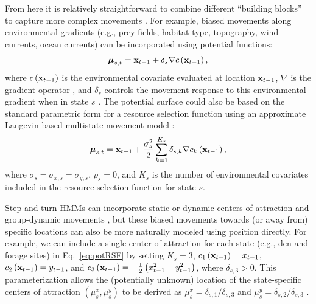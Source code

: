 \documentclass[12pt]{article}\usepackage[]{graphicx}\usepackage[]{xcolor}
\begin{document}
From here it is relatively straightforward to combine different ``building blocks'' to capture more complex movements \citep[e.g.,][]{McClintockEtAl2022}. For example, biased movements along environmental gradients (e.g., prey fields, habitat type, topography, wind currents, ocean currents) can be incorporated using potential functions:
\begin{equation}
\label{eq:potFun}
    {\boldsymbol \mu}_{s,t} = {\bf x}_{t-1} + \delta_s \nabla c \left({\bf x}_{t-1}\right),
\end{equation}
where $c \left({\bf x}_{t-1}\right)$ is the environmental covariate evaluated at location ${\bf x}_{t-1}$, $\nabla$ is the gradient operator \citep[for details on calculating gradients in this context, see][]{GardnerEtAl2022}, and $\delta_s$ controls the movement response to this environmental gradient when in state $s$ \citep[e.g.,][]{BrillingerEtAl2012,HootenEtAl2019}. The potential surface could also be based on the standard parametric form for a resource selection function using an approximate Langevin-based multistate movement model \citep[e.g.,][]{MichelotEtAl2019,McClintockLander2024}:
\begin{equation}
\label{eq:potRSF}
    {\boldsymbol \mu}_{s,t} = {\bf x}_{t-1} + \frac{\sigma_s^2}{2} \sum_{k=1}^{K_s} \delta_{s,k} \nabla c_k\left({\bf x}_{t-1}\right),
\end{equation}
where $\sigma_s=\sigma_{x,s}=\sigma_{y,s}$, $\rho_s=0$, and $K_s$ is the number of environmental covariates included in the resource selection function for state $s$.%

Step and turn HMMs can incorporate static or dynamic centers of attraction \citep[e.g.,][]{McClintockEtAl2012,PirottaEtAl2018} and group-dynamic movements \citep[e.g.,][]{LangrockEtAl2014}, but these biased movements towards (or away from) specific locations can also be more naturally modeled using position directly. For example, we can include a single center of attraction for each state (e.g., den and forage sites) in Eq.\ \ref{eq:potRSF} by setting $K_s=3$, $c_1\left({\bf x}_{t-1}\right)=x_{t-1}$, $c_2\left({\bf x}_{t-1}\right)=y_{t-1}$, and $c_3\left({\bf x}_{t-1}\right)=-\frac{1}{2}\left(x_{t-1}^2+y_{t-1}^2\right)$, where $\delta_{s,3}>0$.
This parameterization allows the (potentially unknown) location of the state-specific centers of attraction $\left(\mu^x_s,\mu^y_s\right)$ to be derived as $\mu^x_s=\delta_{s,1}/\delta_{s,3}$ and $\mu^y_s=\delta_{s,2}/\delta_{s,3}$ \citep[][]{blackwell2024joint}.
\end{document}
